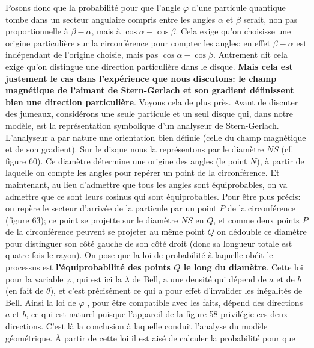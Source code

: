 \vskip3mm 
\endinsert  
Posons donc que la probabilit\'e pour que l'angle $\varphi$ d'une 
particule quantique tombe dans un secteur angulaire  compris entre les 
angles  $\alpha$ et $\beta$ serait, non pas proportionnelle \`a $\beta - 
\alpha$,  mais \`a $\cos\alpha -\cos\beta$. Cela exige qu'on choisisse  
une origine particuli\`ere sur la circonf\'erence pour  compter les angles: 
en effet  $\beta - \alpha$ est ind\'ependant de l'origine choisie, mais 
pas $\cos\alpha -\cos\beta$. Autrement dit cela exige qu'on distingue  
une  direction particuli\`ere dans le disque. {\bf Mais cela est justement 
le cas dans l'exp\'erience que nous discutons: le champ magn\'etique de 
l'aimant de Stern-Gerlach et  son gradient d\'efinissent  bien une  
direction particuli\`ere}.   
\medskip 
Voyons cela de plus pr\`es. Avant de discuter des jumeaux, consid\'erons 
une seule particule et un seul disque qui, dans notre mod\`ele,  
est la repr\'esentation  symbolique d'un analyseur de Stern-Gerlach.  
L'analyseur a par nature  une orientation  bien d\'efinie (celle du champ 
magn\'etique  et de son gradient). Sur le disque nous la repr\'esentons  
par le  diam\`etre $NS$ (cf. figure 60). Ce diam\`etre  d\'etermine une 
origine des angles (le point $N$), \`a partir de laquelle on  compte les 
angles  pour rep\'erer un point de la circonf\'erence. Et maintenant, au 
lieu d'admettre que tous les angles sont \'equiprobables, on va admettre 
que ce sont leurs cosinus qui sont \'equiprobables. Pour \^etre plus 
pr\'ecis: on rep\`ere le secteur d'arriv\'ee de la particule  par un point  
$P$ de la circonf\'erence (figure 63); ce point se projette sur le 
diam\`etre $NS$ en $Q$,  et comme deux points $P$ de la circonf\'erence 
peuvent se projeter au m\^eme point $Q$ on d\'edouble ce diam\`etre  
pour distinguer son  c\^ot\'e gauche de son c\^ot\'e droit (donc sa  
longueur totale est quatre fois le rayon). On pose que la loi de 
probabilit\'e \`a laquelle  ob\'eit le processus est {\bf 
l'\'equiprobabilit\'e des points $Q$ le long  du diam\`etre}.  Cette
loi pour la variable $\varphi$, qui est ici la $\lambda$ de Bell, a une 
densit\'e qui d\'epend de $a$ et de $b$ (en fait de $\theta$), et c'est 
pr\'ecis\'ement ce qui a pour effet d'invalider les in\'egalit\'es de Bell.
Ainsi la loi de $\varphi$ , pour \^etre compatible avec les faits,  
d\'epend des directions $a$ et $b$, ce qui est naturel puisque 
l'appareil de la figure 58 privil\'egie ces deux directions. C'est l\`a 
la conclusion \`a laquelle conduit l'analyse du mod\`ele g\'eom\'etrique. 
\medskip  
\`A partir de cette loi il est ais\'e de calculer la probabilit\'e pour que  
